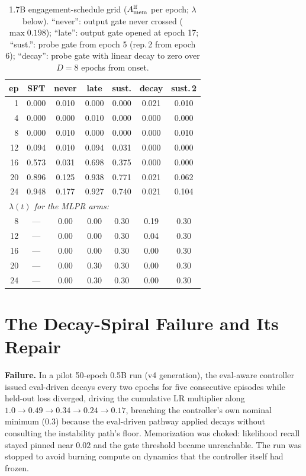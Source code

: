 \begin{table}[h]
\centering
\scriptsize
\setlength{\tabcolsep}{2.6pt}
\begin{tabular*}{\columnwidth}{@{\extracolsep{\fill}} r cccccc}
\toprule
ep & SFT & never & late & sust. & decay & sust.\,2 \\
\midrule
1 & 0.000 & 0.010 & 0.000 & 0.000 & 0.021 & 0.010 \\
4 & 0.000 & 0.000 & 0.010 & 0.000 & 0.000 & 0.000 \\
8 & 0.000 & 0.010 & 0.000 & 0.000 & 0.000 & 0.010 \\
12 & 0.094 & 0.010 & 0.094 & 0.031 & 0.000 & 0.000 \\
16 & 0.573 & 0.031 & 0.698 & 0.375 & 0.000 & 0.000 \\
20 & 0.896 & 0.125 & 0.938 & 0.771 & 0.021 & 0.062 \\
24 & 0.948 & 0.177 & 0.927 & 0.740 & 0.021 & 0.104 \\
\midrule
\multicolumn{7}{l}{\emph{$\lambda(t)$ for the MLPR arms:}}\\
8 & --- & 0.00 & 0.00 & 0.30 & 0.19 & 0.30 \\
12 & --- & 0.00 & 0.00 & 0.30 & 0.04 & 0.30 \\
16 & --- & 0.00 & 0.00 & 0.30 & 0.00 & 0.30 \\
20 & --- & 0.00 & 0.30 & 0.30 & 0.00 & 0.30 \\
24 & --- & 0.00 & 0.30 & 0.30 & 0.00 & 0.30 \\
\bottomrule
\end{tabular*}
\caption{1.7B engagement-schedule grid ($A_{\mathrm{mem}}^{\mathrm{lf}}$ per epoch; $\lambda$
below). ``never'': output gate never crossed ($\max 0.198$);
``late'': output gate opened at epoch 17; ``sust.'': probe gate from
epoch 5 (rep.\,2 from epoch 6); ``decay'': probe gate with linear
decay to zero over $D{=}8$ epochs from onset.}
\label{tab:curves17}
\end{table}

\section{The Decay-Spiral Failure and Its Repair}
\label{app:spiral}

\textbf{Failure.} In a pilot 50-epoch 0.5B run (v4 generation), the
eval-aware controller issued eval-driven decays every two epochs for
five consecutive episodes while held-out loss diverged, driving the
cumulative LR multiplier along
$1.0 \to 0.49 \to 0.34 \to 0.24 \to 0.17$, breaching the controller's
own nominal minimum ($0.3$) because the eval-driven pathway applied
decays without consulting the instability path's floor. Memorization
was choked: likelihood recall stayed pinned near $0.02$ and the gate
threshold became unreachable. The run was stopped to avoid burning
compute on dynamics that the controller itself had frozen.

